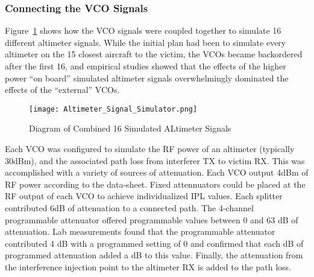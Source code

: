 \subsubsection{Connecting the VCO Signals}
Figure~\ref{fig:VCO_Coupler} shows how the VCO signals were coupled together to simulate 16 different altimeter signals. While the initial plan had been to simulate every altimeter on the 15 closest aircraft to the victim, the VCOs became backordered after the first 16, and empirical studies showed that the effects of the higher power ``on board'' simulated altimeter signals overwhelmingly dominated the effects of the ``external'' VCOs. 
\begin{figure}[ht]
\centering
\texttt{[image: Altimeter\_Signal\_Simulator.png]}
\caption{Diagram of Combined 16 Simulated ALtimeter Signals}

\label{fig:VCO_Coupler}

\end{figure}
Each VCO was configured to simulate the RF power of an altimeter (typically 30dBm), and the associated path loss from interferer TX to victim RX. This was accomplished with a variety of sources of attenuation. Each VCO output 4dBm of RF power according to the data-sheet. Fixed attennuators could be placed at the RF output of each VCO to achieve individualized IPL values. Each splitter contributed 6dB of attenuation to a connected path. The 4-channel programmable attenuator offered programmable values between 0 and 63 dB of attenuation. Lab measurements found that the programmable attenuator contributed 4 dB with a programmed setting of 0 and confirmed that each dB of programmed attenuation added a dB to this value. Finally, the attenuation from the interference injection point to the altimeter RX is added to the path loss. 

